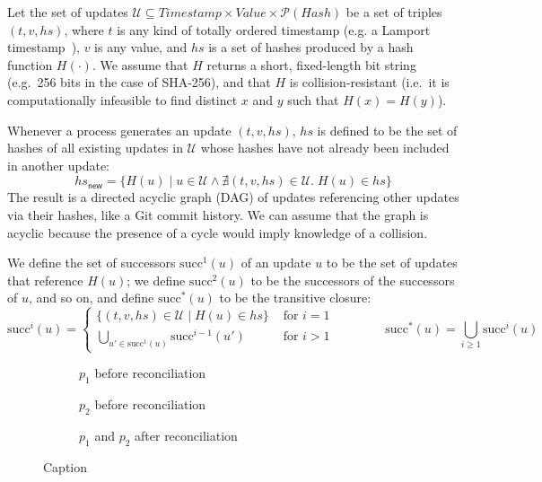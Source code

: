 \documentclass[manuscript]{acmart}
\begin{document}
Let the set of updates $\mathcal{U} \subseteq \mathit{Timestamp} \times \mathit{Value} \times \mathcal{P}(\mathit{Hash})$ be a set of triples $(t, v, \mathit{hs})$, where $t$ is any kind of totally ordered timestamp (e.g. a Lamport timestamp~\cite{Lamport:1978}), $v$ is any value, and $\mathit{hs}$ is a set of hashes produced by a hash function $H(\cdot)$.
We assume that $H$ returns a short, fixed-length bit string (e.g.\ 256 bits in the case of SHA-256), and that $H$ is collision-resistant (i.e.\ it is computationally infeasible to find distinct $x$ and $y$ such that $H(x) = H(y)$).

Whenever a process generates an update $(t, v, \mathit{hs})$, $\mathit{hs}$ is defined to be the set of hashes of all existing updates in $\mathcal{U}$ whose hashes have not already been included in another update:
\[
\mathit{hs}_\mathsf{new} = \{H(u) \mid u \in \mathcal{U} \wedge \nexists (t, v, \mathit{hs}) \in \mathcal{U}.\; H(u) \in \mathit{hs}\}
\]
The result is a directed acyclic graph (DAG) of updates referencing other updates via their hashes, like a Git commit history.
We can assume that the graph is acyclic because the presence of a cycle would imply knowledge of a collision.

We define the set of successors $\mathrm{succ}^1(u)$ of an update $u$ to be the set of updates that reference $H(u)$; we define $\mathrm{succ}^2(u)$ to be the successors of the successors of $u$, and so on, and define $\mathrm{succ}^*(u)$ to be the transitive closure:
\[
\mathrm{succ}^i(u) =
\begin{cases}
\{(t, v, \mathit{hs}) \in \mathcal{U} \mid H(u) \in \mathit{hs}\} & \text{ for } i=1 \\
\bigcup_{u' \in \mathrm{succ}^1(u)} \mathrm{succ}^{i-1}(u') & \text{ for } i>1
\end{cases}
\quad\quad\quad\quad
\mathrm{succ}^*(u) = \bigcup_{i \ge 1} \mathrm{succ}^i(u)
\]

\begin{figure}
    \centering
    \begin{subfigure}[t]{0.3\textwidth}
    
    \caption{$p_1$ before reconciliation}
    \end{subfigure}
    \begin{subfigure}[t]{0.3\textwidth}
    
    \caption{$p_2$ before reconciliation}
    \end{subfigure}
    \begin{subfigure}[t]{0.3\textwidth}
    
    \caption{$p_1$ and $p_2$ after reconciliation}
    \end{subfigure}
    \caption{Caption}
    \label{fig:my_label}
\end{figure}
\end{document}
